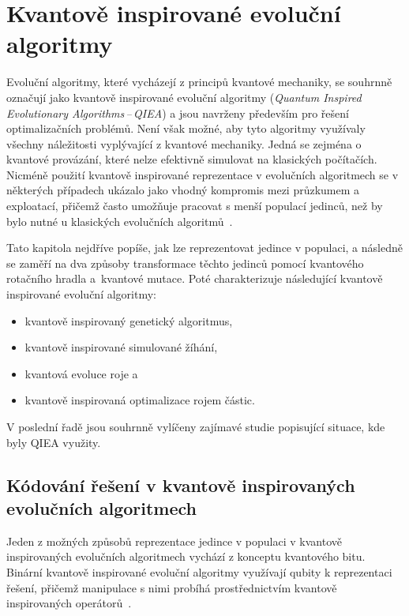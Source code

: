 \chapter{Kvantově inspirované evoluční algoritmy} \label{chapt:qiea}
Evoluční algoritmy, které vycházejí z principů kvantové mechaniky, se souhrnně označují jako kvantově inspirované evoluční algoritmy (\emph{Quantum Inspired Evolutionary Algorithms\,--\,QIEA}) a jsou navrženy především pro řešení optimalizačních problémů. 
Není však možné, aby tyto algoritmy využívaly všechny náležitosti vyplývající z kvantové mechaniky. 
Jedná se zejména o kvantové provázání, které nelze efektivně simulovat na klasických počítačích. 
Nicméně použití kvantově inspirované reprezentace v evolučních algoritmech se v některých případech ukázalo jako vhodný kompromis mezi průzkumem a exploatací, přičemž často umožňuje pracovat s menší populací jedinců, než by bylo nutné u klasických evolučních algoritmů~\cite{NaturalComputing}.

Tato kapitola nejdříve popíše, jak lze reprezentovat jedince v populaci, a následně se zaměří na dva způsoby transformace těchto jedinců pomocí kvantového rotačního hradla a~kvantové mutace. 
Poté charakterizuje následující kvantově inspirované evoluční algoritmy:
\begin{itemize}
    \item kvantově inspirovaný genetický algoritmus,
    \item kvantově inspirované simulované žíhání,
    \item kvantová evoluce roje a
    \item kvantově inspirovaná optimalizace rojem částic.
\end{itemize}
V poslední řadě jsou souhrnně vylíčeny zajímavé studie popisující situace, kde byly QIEA využity. 

\section{Kódování řešení v kvantově inspirovaných evolučních algoritmech}
Jeden z možných způsobů reprezentace jedince v populaci v kvantově inspirovaných evolučních algoritmech vychází z konceptu kvantového bitu. 
Binární kvantově inspirované evoluční algoritmy využívají qubity k reprezentaci řešení, přičemž manipulace s nimi probíhá prostřednictvím kvantově inspirovaných operátorů~\cite{NaturalComputing}. 

